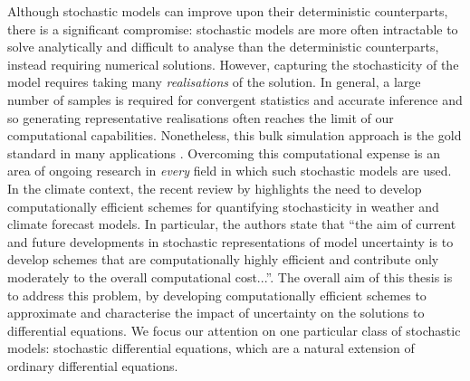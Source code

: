 Although stochastic models can improve upon their deterministic counterparts, there is a significant compromise: stochastic models are more often intractable to solve analytically and difficult to analyse than the deterministic counterparts, instead requiring numerical solutions.
However, capturing the stochasticity of the model requires taking many \emph{realisations} of the solution.
In general, a large number of samples is required for convergent statistics and accurate inference \citep{FepponLermusiaux_2018_DynamicallyOrthogonalNumerical,Leutbecher_2019_EnsembleSizeHow} and so generating representative realisations often reaches the limit of our computational capabilities.
Nonetheless, this bulk simulation approach is the gold standard in many applications \citep[e.g.]{Collins_2007_EnsemblesProbabilitiesNew,LeutbecherEtAl_2017_StochasticRepresentationsModel}.
Overcoming this computational expense is an area of ongoing research in \emph{every} field in which such stochastic models are used.
In the climate context, the recent review by \citet{LeutbecherEtAl_2017_StochasticRepresentationsModel} highlights the need to develop computationally efficient schemes for quantifying stochasticity in weather and climate forecast models.
In particular, the authors state that ``the aim of current and future developments in stochastic representations of model uncertainty is to develop schemes that are computationally highly efficient and contribute only moderately to the overall computational cost...''.
The overall aim of this thesis is to address this problem, by developing computationally efficient schemes to approximate and characterise the impact of uncertainty on the solutions to differential equations.
We focus our attention on one particular class of stochastic models: stochastic differential equations, which are a natural extension of ordinary differential equations.


